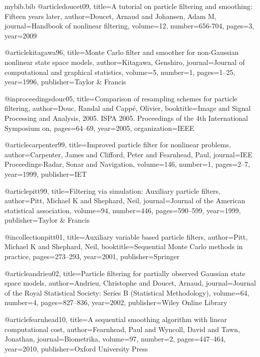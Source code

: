 \RequirePackage{filecontents}

\begin{filecontents*}{mybib.bib}
@article{doucet09,
  title={A tutorial on particle filtering and smoothing: Fifteen years later},
  author={Doucet, Arnaud and Johansen, Adam M},
  journal={Handbook of nonlinear filtering},
  volume={12},
  number={656-704},
  pages={3},
  year={2009}
}

@article{kitagawa96,
  title={Monte Carlo filter and smoother for non-Gaussian nonlinear state space models},
  author={Kitagawa, Genshiro},
  journal={Journal of computational and graphical statistics},
  volume={5},
  number={1},
  pages={1--25},
  year={1996},
  publisher={Taylor \& Francis}
}

@inproceedings{douc05,
  title={Comparison of resampling schemes for particle filtering},
  author={Douc, Randal and Capp{\'e}, Olivier},
  booktitle={Image and Signal Processing and Analysis, 2005. ISPA 2005. Proceedings of the 4th International Symposium on},
  pages={64--69},
  year={2005},
  organization={IEEE}
}

@article{carpenter99,
  title={Improved particle filter for nonlinear problems},
  author={Carpenter, James and Clifford, Peter and Fearnhead, Paul},
  journal={IEE Proceedings-Radar, Sonar and Navigation},
  volume={146},
  number={1},
  pages={2--7},
  year={1999},
  publisher={IET}
}

@article{pitt99,
  title={Filtering via simulation: Auxiliary particle filters},
  author={Pitt, Michael K and Shephard, Neil},
  journal={Journal of the American statistical association},
  volume={94},
  number={446},
  pages={590--599},
  year={1999},
  publisher={Taylor \& Francis}
}

@incollection{pitt01,
  title={Auxiliary variable based particle filters},
  author={Pitt, Michael K and Shephard, Neil},
  booktitle={Sequential Monte Carlo methods in practice},
  pages={273--293},
  year={2001},
  publisher={Springer}
}

@article{andrieu02,
  title={Particle filtering for partially observed Gaussian state space models},
  author={Andrieu, Christophe and Doucet, Arnaud},
  journal={Journal of the Royal Statistical Society: Series B (Statistical Methodology)},
  volume={64},
  number={4},
  pages={827--836},
  year={2002},
  publisher={Wiley Online Library}
}

@article{fearnhead10,
  title={A sequential smoothing algorithm with linear computational cost},
  author={Fearnhead, Paul and Wyncoll, David and Tawn, Jonathan},
  journal={Biometrika},
  volume={97},
  number={2},
  pages={447--464},
  year={2010},
  publisher={Oxford University Press}
}


\end{filecontents*}
